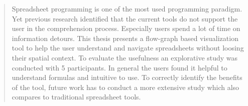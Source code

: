 \begin{abstract}
    Spreadsheet programming is one of the most used programming paradigm. Yet previous research identified that the current tools do not support the user in the comprehension process. Especially users spend a lot of time on information detours. This thesis presents a flow-graph based visualization tool to help the user understand and navigate spreadsheets without loosing their spatial context. To evaluate the usefulness an explorative study was conducted with 5 participants. In general the users found it helpful to understand formulas and intuitive to use. To correctly identify the benefits of the tool, future work has to conduct a more extensive study which also compares to traditional spreadsheet tools.
\end{abstract}